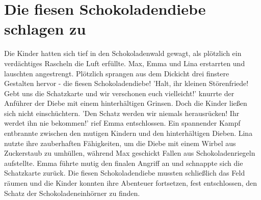\documentclass[12pt]{article} %
\begin{document}
\section{ Die fiesen Schokoladendiebe schlagen zu }
\begin{minipage}{\textwidth}
    Die Kinder hatten sich tief in den Schokoladenwald gewagt, als plötzlich ein verdächtiges Rascheln die Luft erfüllte. Max, Emma und Lina erstarrten und lauschten angestrengt. Plötzlich sprangen aus dem Dickicht drei finstere Gestalten hervor - die fiesen Schokoladendiebe! 'Halt, ihr kleinen Störenfriede! Gebt uns die Schatzkarte und wir verschonen euch vielleicht!' knurrte der Anführer der Diebe mit einem hinterhältigen Grinsen. Doch die Kinder ließen sich nicht einschüchtern. 'Den Schatz werden wir niemals herausrücken! Ihr werdet ihn nie bekommen!' rief Emma entschlossen. Ein spannender Kampf entbrannte zwischen den mutigen Kindern und den hinterhältigen Dieben. Lina nutzte ihre zauberhaften Fähigkeiten, um die Diebe mit einem Wirbel aus Zuckerstaub zu umhüllen, während Max geschickt Fallen aus Schokoladenriegeln aufstellte. Emma führte mutig den finalen Angriff an und schnappte sich die Schatzkarte zurück. Die fiesen Schokoladendiebe mussten schließlich das Feld räumen und die Kinder konnten ihre Abenteuer fortsetzen, fest entschlossen, den Schatz der Schokoladeneinhörner zu finden.
\end{minipage}
\end{document}
